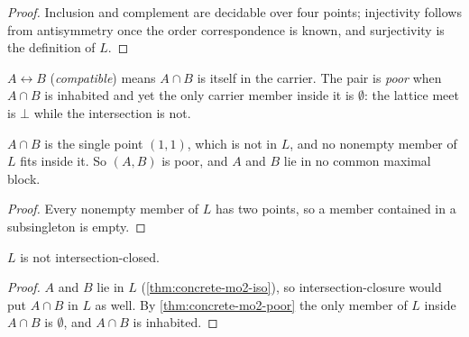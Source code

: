 \begin{proof}
  \leanok
  Inclusion and complement are decidable over four points; injectivity follows
  from antisymmetry once the order correspondence is known, and surjectivity is
  the definition of $L$.
\end{proof}

\begin{definition}
  \label{def:poor-pair}
  \leanok
  $A \leftrightarrow B$ (\emph{compatible}) means $A \cap B$ is itself in the
  carrier. The pair is \emph{poor} when $A \cap B$ is inhabited and yet the only
  carrier member inside it is $\emptyset$: the lattice meet is $\bot$ while the
  intersection is not.
\end{definition}

\begin{theorem}
  \label{thm:concrete-mo2-poor}
  \leanok
  $A \cap B$ is the single point $(1,1)$, which is not in $L$, and no nonempty
  member of $L$ fits inside it. So $(A,B)$ is poor, and $A$ and $B$ lie in no
  common maximal block.
\end{theorem}

\begin{proof}
  \leanok
  Every nonempty member of $L$ has two points, so a member contained in a
  subsingleton is empty.
\end{proof}

\begin{corollary}
  \label{cor:concrete-mo2-not-interclosed}
  \leanok
  $L$ is not intersection-closed.
\end{corollary}

\begin{proof}
  \leanok
  $A$ and $B$ lie in $L$ (\ref{thm:concrete-mo2-iso}), so intersection-closure
  would put $A \cap B$ in $L$ as well. By \ref{thm:concrete-mo2-poor} the only
  member of $L$ inside $A \cap B$ is $\emptyset$, and $A \cap B$ is inhabited.
\end{proof}

